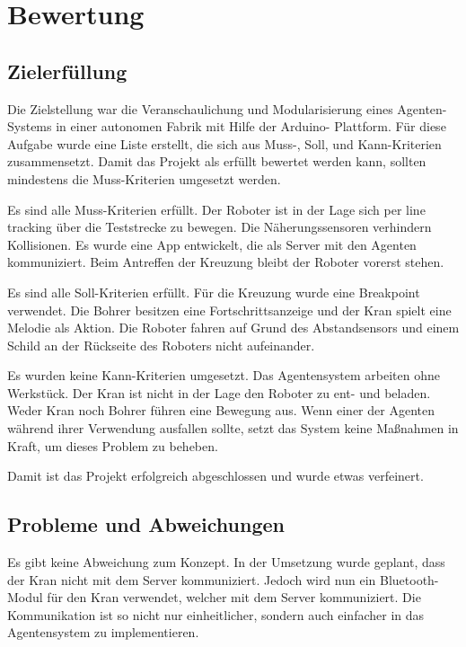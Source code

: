 \chapter{Bewertung}


\section{Zielerfüllung}

Die Zielstellung war die Veranschaulichung und Modularisierung eines Agenten-Systems in einer autonomen Fabrik mit Hilfe der Arduino- Plattform. Für diese Aufgabe wurde eine Liste erstellt, die sich aus Muss-, Soll, und Kann-Kriterien zusammensetzt. Damit das Projekt als erfüllt bewertet werden kann, sollten mindestens die Muss-Kriterien umgesetzt werden.

Es sind alle Muss-Kriterien erfüllt. Der Roboter ist in der Lage sich per line tracking über die Teststrecke zu bewegen. Die Näherungssensoren verhindern Kollisionen. Es wurde eine App entwickelt, die als Server mit den Agenten kommuniziert. Beim Antreffen der Kreuzung bleibt der Roboter vorerst stehen.

Es sind alle Soll-Kriterien erfüllt. Für die Kreuzung wurde eine Breakpoint verwendet. Die Bohrer besitzen eine Fortschrittsanzeige und der Kran spielt eine Melodie als Aktion. Die Roboter fahren auf Grund des Abstandsensors und einem Schild an der Rückseite des Roboters nicht aufeinander.

Es wurden keine Kann-Kriterien umgesetzt. Das Agentensystem arbeiten ohne Werkstück. Der Kran ist nicht in der Lage den Roboter zu ent- und beladen. Weder Kran noch Bohrer führen eine Bewegung aus. Wenn einer der Agenten während ihrer Verwendung ausfallen sollte, setzt das System keine Maßnahmen in Kraft, um dieses Problem zu beheben.

Damit ist das Projekt erfolgreich abgeschlossen und wurde etwas verfeinert.

\section{Probleme und Abweichungen}

Es gibt keine Abweichung zum Konzept. In der Umsetzung wurde geplant, dass der Kran nicht mit dem Server kommuniziert. Jedoch wird nun ein Bluetooth-Modul für den Kran verwendet, welcher mit dem Server kommuniziert. Die Kommunikation ist so nicht nur einheitlicher, sondern auch einfacher in das Agentensystem zu implementieren.

